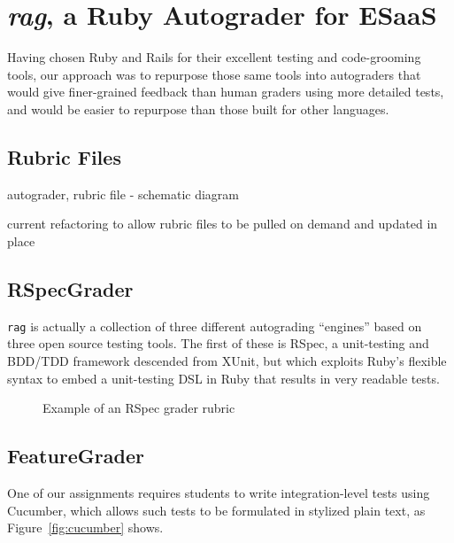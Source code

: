 \section{\emph{rag}, a Ruby Autograder for ESaaS}


Having chosen Ruby and Rails for their excellent testing and
code-grooming tools, our approach was to repurpose those same tools into
autograders that would give finer-grained feedback than human graders
using more detailed tests, and would be easier to repurpose than
those built for other languages.

\subsection{Rubric Files}

autograder, rubric file - schematic diagram

current refactoring to allow rubric files to be pulled on demand and
updated in place

\subsection{RSpecGrader}

\texttt{rag} 
is actually a collection of three different autograding
``engines'' based on three open source testing
tools.  The first of these is
RSpec, a unit-testing and
BDD/TDD framework descended from XUnit, but which exploits Ruby's
flexible syntax to embed a unit-testing DSL in Ruby that results in very
readable tests.  


\begin{figure}
  \centering
    
  \caption{\label{fig:rspec-grader-rubric}
    Example of an RSpec grader rubric
  }
\end{figure}


\subsection{FeatureGrader}

One of our assignments requires students to write integration-level
tests using Cucumber, which allows such tests to be formulated in
stylized plain text, as Figure~\ref{fig:cucumber} shows.

